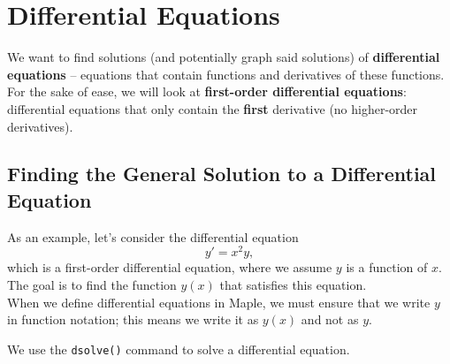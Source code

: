 \chapter{Differential Equations}
\label{chp:differential_equations}						

We want to find solutions (and potentially graph said solutions) of \textbf{differential equations} -- equations that contain functions and derivatives of these functions. For the sake of ease, we will look at \textbf{first-order differential equations}: differential equations that only contain the \textbf{first} derivative (no higher-order derivatives).

\section{Finding the General Solution to a Differential Equation}

As an example, let's consider the differential equation $$y'=x^2y,$$ which is a first-order differential equation, where we assume $y$ is a function of $x$. The goal is to find the function $y(x)$ that satisfies this equation. \\

When we define differential equations in Maple, we must ensure that we write $y$ in function notation; this means we write it as $y(x)$ and not as $y$.

\begin{maplegroup}
\begin{mapleinput}
\end{mapleinput}
\mapleresult
\begin{maplelatex}
\end{maplelatex}
\end{maplegroup}

We use the \texttt{dsolve()} command to solve a differential equation.


\begin{maplegroup}
\begin{mapleinput}
\end{mapleinput}
\mapleresult
\begin{maplelatex}
\end{maplelatex}
\end{maplegroup}

